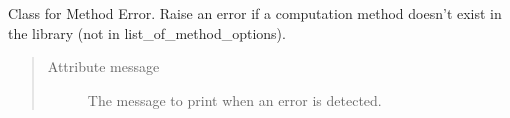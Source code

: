 \documentclass[letterpaper,10pt,english]{sphinxmanual}
\begin{document}

\begin{fulllineitems}
\label{doc:gedlibpy.MethodError}
Class for Method Error. Raise an error if a computation method doesn't exist in the library (not in list\_of\_method\_options).
\begin{quote}\begin{description}
\item[{Attribute message}] \leavevmode
The message to print when an error is detected.

\end{description}\end{quote}

\end{fulllineitems}

\end{document}
